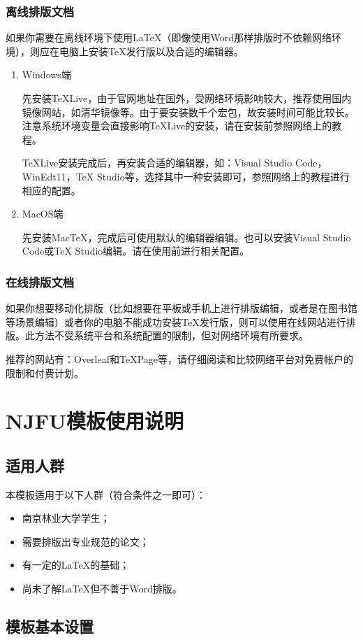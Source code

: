 \documentclass[oneside,zihao=-4]{ctexbook}
\begin{document}
\subsection{离线排版文档}
如果你需要在离线环境下使用\LaTeX{}（即像使用Word那样排版时不依赖网络环境），则应在电脑上安装\TeX{}发行版以及合适的编辑器。
\begin{enumerate}
  \item Windows端\par
  \qquad 先安装\TeX{}Live，由于官网地址在国外，受网络环境影响较大，推荐使用国内镜像网站，如清华镜像等。由于要安装数千个宏包，故安装时间可能比较长。注意系统环境变量会直接影响\TeX{}Live的安装，请在安装前参照网络上的教程。\par
  \qquad \TeX{}Live安装完成后，再安装合适的编辑器，如：Visual Studio Code，WinEdt11，\TeX{} Studio等，选择其中一种安装即可，参照网络上的教程进行相应的配置。
  \item MacOS端\par
  \qquad 先安装Mac\TeX{}，完成后可使用默认的编辑器编辑。也可以安装Visual Studio Code或\TeX{} Studio编辑。请在使用前进行相关配置。
\end{enumerate}
\subsection{在线排版文档}
如果你想要移动化排版（比如想要在平板或手机上进行排版编辑，或者是在图书馆等场景编辑）或者你的电脑不能成功安装\TeX{}发行版，则可以使用在线网站进行排版。此方法不受系统平台和系统配置的限制，但对网络环境有所要求。\par
推荐的网站有：Overleaf和\TeX{}Page等，请仔细阅读和比较网络平台对免费帐户的限制和付费计划。

\chapter{NJFU模板使用说明}
\section{适用人群}
本模板适用于以下人群（符合条件之一即可）：
\begin{itemize}
    \item 南京林业大学学生；
    \item 需要排版出专业规范的论文；
    \item 有一定的\LaTeX{}的基础；
    \item 尚未了解\LaTeX{}但不善于Word排版。
\end{itemize}
\section{模板基本设置}
\end{document}
